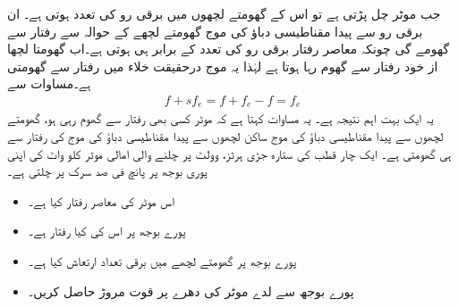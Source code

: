 جب موٹر چل پڑتی ہے تو اس کے گھومتے لچھوں میں برقی رو کی تعدد  ہوتی ہے۔ ان برقی رو سے پیدا مقناطیسی دباؤ کی موج گھومتے لچھے کے حوالہ سے  رفتار سے گھومے گی چونکہ معاصر رفتار برقی رو کی تعدد کے برابر ہی ہوتی ہے۔اب گھومتا لچھا از خود  رفتار سے گھوم رہا ہوتا ہے لہٰذا یہ موج درحقیقت خلاء میں  رفتار سے گھومتی ہے۔مساوات   سے
\begin{align}
f+s f_e=f +f_e-f=f_e
\end{align} 
یہ ایک بہت اہم نتیجہ ہے۔ یہ مساوات کہتا ہے کہ موٹر کسی بھی رفتار سے گھوم رہی ہو، گھومتے لچھوں سے پیدا مقناطیسی دباؤ کی موج ساکن لچھوں سے پیدا مقناطیسی دباؤ کی موج کی رفتار سے ہی گھومتی ہے۔
%
ایک چار قطب کی ستارہ جڑی  ہرٹز،  وولٹ  پر چلنے والی امالی موٹر  کلو واٹ کی اپنی پوری بوجھ پر پانچ فی صد سرک پر چلتی ہے۔
\begin{itemize}
\item
اس موٹر کی معاصر رفتار کیا ہے۔
\item
پورے بوجھ پر اس کی کیا رفتار ہے۔
\item
پورے بوجھ پر گھومتے لچھے میں برقی تعداد ارتعاش کیا ہے۔
\item
پورے بوجھ سے لدے موٹر کی دھرے پر قوت مروڑ حاصل کریں۔
\end{itemize}

